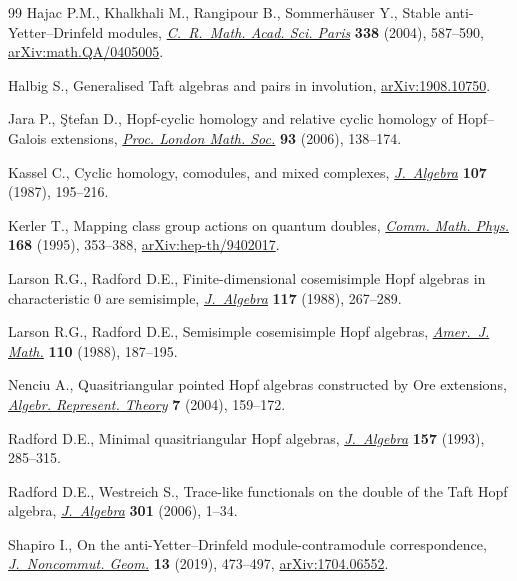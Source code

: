 \begin{thebibliography}{99}
Hajac P.M., Khalkhali M., Rangipour B., Sommerh\"auser Y., Stable
 anti-{Y}etter--{D}rinfeld modules, \href{https://doi.org/10.1016/j.crma.2003.11.037}{\textit{C.~R.~Math. Acad. Sci. Paris}}
 \textbf{338} (2004), 587--590, \href{https://arxiv.org/abs/math.QA/0405005}{arXiv:math.QA/0405005}.

Halbig S., Generalised {T}aft algebras and pairs in involution,
 \href{https://arxiv.org/abs/1908.10750}{arXiv:1908.10750}.

Jara P., \c{S}tefan D., Hopf-cyclic homology and relative cyclic homology of
 {H}opf--{G}alois extensions, \href{https://doi.org/10.1017/S0024611506015772}{\textit{Proc. London Math. Soc.}} \textbf{93}
 (2006), 138--174.

Kassel C., Cyclic homology, comodules, and mixed complexes, \href{https://doi.org/10.1016/0021-8693(87)90086-X}{\textit{J.~Algebra}}
 \textbf{107} (1987), 195--216.

Kerler T., Mapping class group actions on quantum doubles, \href{https://doi.org/10.1007/BF02101554}{\textit{Comm. Math.
 Phys.}} \textbf{168} (1995), 353--388, \href{https://arxiv.org/abs/hep-th/9402017}{arXiv:hep-th/9402017}.

Larson R.G., Radford D.E., Finite-dimensional cosemisimple {H}opf algebras in
 characteristic {$0$} are semisimple, \href{https://doi.org/10.1016/0021-8693(88)90107-X}{\textit{J.~Algebra}} \textbf{117} (1988),
 267--289.

Larson R.G., Radford D.E., Semisimple cosemisimple {H}opf algebras,
 \href{https://doi.org/10.2307/2374545}{\textit{Amer.~J. Math.}} \textbf{110} (1988), 187--195.

Nenciu A., Quasitriangular pointed {H}opf algebras constructed by {O}re
 extensions, \href{https://doi.org/10.1023/B:ALGE.0000026785.03997.60}{\textit{Algebr. Represent. Theory}} \textbf{7} (2004), 159--172.

Radford D.E., Minimal quasitriangular {H}opf algebras, \href{https://doi.org/10.1006/jabr.1993.1102}{\textit{J.~Algebra}}
 \textbf{157} (1993), 285--315.

Radford D.E., Westreich S., Trace-like functionals on the double of the {T}aft
 {H}opf algebra, \href{https://doi.org/10.1016/j.jalgebra.2004.04.023}{\textit{J.~Algebra}} \textbf{301} (2006), 1--34.

Shapiro I., On the anti-{Y}etter--{D}rinfeld module-contramodule
 correspondence, \href{https://doi.org/10.4171/JNCG/327}{\textit{J.~Noncommut. Geom.}} \textbf{13} (2019), 473--497,
 \href{https://arxiv.org/abs/1704.06552}{arXiv:1704.06552}.


\end{thebibliography}
